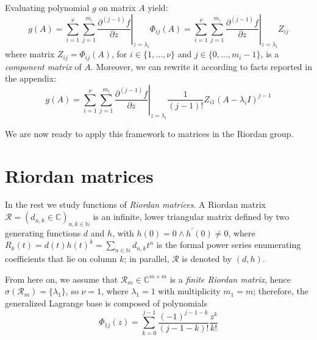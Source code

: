 Evaluating polynomial $g$ on matrix $A$ yield:
\begin{displaymath}
g(A) = \sum_{i=1}^{\nu}{\sum_{j=1}^{m_{i}}{ \left.  \frac{\partial^{(j-1)}{f}}{\partial{z}} \right|_{z=\lambda_{i}}\Phi_{ij}(A) }}
     = \sum_{i=1}^{\nu}{\sum_{j=1}^{m_{i}}{ \left.  \frac{\partial^{(j-1)}{f}}{\partial{z}} \right|_{z=\lambda_{i}}Z_{ij} }}
\end{displaymath}
where matrix $Z_{ij}=\Phi_{ij}(A)$, for $i\in \lbrace 1, \ldots, \nu \rbrace$
and $j \in \lbrace 0, \ldots, m_{i}-1 \rbrace$, is a \textit{component matrix}
of $A$. Moreover, we can rewrite it according to facts reported in the appendix:
\begin{displaymath}
g(A) = \sum_{i=1}^{\nu}{\sum_{j=1}^{m_{i}}{ \left.  \frac{\partial^{(j-1)}{f}}{\partial{z}} \right|_{z=\lambda_{i}}\frac{1}{(j-1)!}{Z_{i1}(A-\lambda_{i}I)^{j-1}} }}
\end{displaymath}

We are now ready to apply this framework to matrices in the Riordan group.

\section*{Riordan matrices}

In the rest we study functions of \emph{Riordan matrices}. A Riordan matrix
$\mathcal{R}=(d_{n,k}\in\mathbb{C})_{n,k\in\mathbb{N}}$ is an infinite, lower
triangular matrix defined by two generating functions $d$ and $h$, with $h(0)=0
\wedge h^{\prime}(0)\neq0$, where $R_{k}(t) = d(t)h(t)^{k} =
\sum_{n\in\mathbb{N}}{d_{n,k}t^{n}}$ is the formal power series enumerating
coefficients that lie on column $k$; in parallel, $\mathcal{R}$ is denoted by $(d,
h)$. 

From here on, we assume that $\mathcal{R}_{m}\in\mathbb{C}^{m\times m}$ is a
\emph{finite Riordan matrix}, hence $\sigma(\mathcal{R}_{m})= \lbrace
\lambda_{1} \rbrace$, so $\nu=1$, where $\lambda_{1}=1$ with multiplicity
$m_{1}=m$;  therefore, the generalized Lagrange base is composed of polynomials
\begin{displaymath}
  \Phi_{1j}(z) = \sum_{k=0}^{j-1}{\frac{(-1)^{j-1-k}}{(j-1-k)!}\frac{z^{k}}{k!}}
\end{displaymath}

